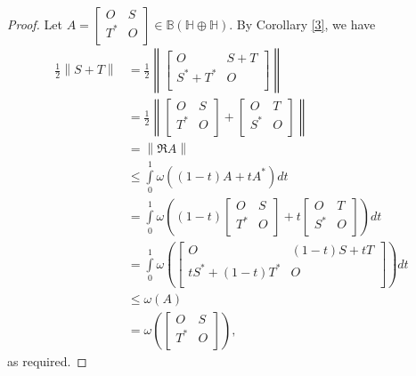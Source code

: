 \documentclass[12pt,twoside,reqno]{amsart}
\numberwithin{equation}{section}
\begin{document}
\begin{proof}
Let  $A=\left[ \begin{matrix}
   O & S  \\
   {{T}^{*}} & O  \\
\end{matrix} \right]\in\mathbb{B}(\mathbb H\oplus \mathbb H)$. By Corollary \ref{3}, we have
\[\begin{aligned}
   \frac{1}{2}\left\| S+T \right\|&=\frac{1}{2}\left\| \left[ \begin{matrix}
   O & S+T  \\
   {{S}^{*}}+{{T}^{*}} & O  \\
\end{matrix} \right] \right\| \\ 
 & =\frac{1}{2}\left\| \left[ \begin{matrix}
   O & S  \\
   {{T}^{*}} & O  \\
\end{matrix} \right]+\left[ \begin{matrix}
   O & T  \\
   {{S}^{*}} & O  \\
\end{matrix} \right] \right\| \\ 
 & =\left\| \Re A \right\| \\ 
 & \le \int\limits_{0}^{1}{\omega \left( \left( 1-t \right)A+t{{A}^{*}} \right)dt} \\ 
 & =\int\limits_{0}^{1}{\omega \left( \left( 1-t \right)\left[ \begin{matrix}
   O & S  \\
   {{T}^{*}} & O  \\
\end{matrix} \right]+t\left[ \begin{matrix}
   O & T  \\
   {{S}^{*}} & O  \\
\end{matrix} \right] \right)dt} \\ 
 & =\int\limits_{0}^{1}{\omega \left( \left[ \begin{matrix}
   O & \left( 1-t \right)S+tT  \\
   t{{S}^{*}}+\left( 1-t \right){{T}^{*}} & O  \\
\end{matrix} \right] \right)dt} \\ 
 & \le \omega \left( A \right) \\ 
 & =\omega \left( \left[ \begin{matrix}
   O & S  \\
   {{T}^{*}} & O  \\
\end{matrix} \right] \right),  
\end{aligned}\]
as required.
\end{proof}
\end{document}
